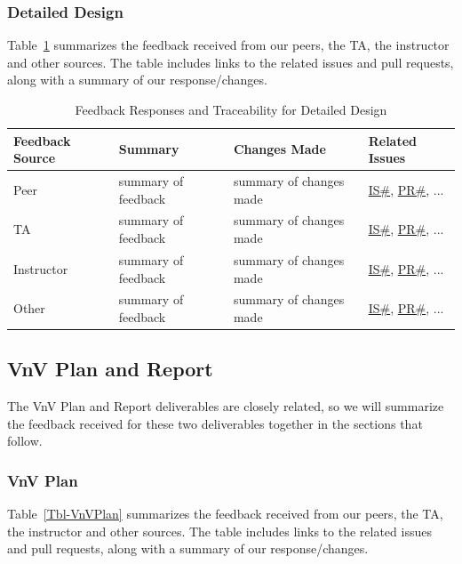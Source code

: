 \documentclass{article}
\begin{document}
\subsubsection{Detailed Design}

Table~\ref{Tbl-DetailedDesign} summarizes the feedback received from our peers,
the TA, the instructor and other sources.  The table includes links to the
related issues and pull requests, along with a summary of our response/changes.

\begin{longtable}{|p{2cm}|p{4cm}|p{5cm}|p{4cm}|}
\caption{Feedback Responses and Traceability for Detailed Design}
\label{Tbl-DetailedDesign}\\

\hline
\textbf{Feedback Source} & \textbf{Summary} & \textbf{Changes Made} & \textbf{Related Issues} \\ 
\hline
\endhead

Peer & summary of feedback & summary of changes made & \href{link}{IS\#}, \href{link}{PR\#}, ... \\
\hline
TA & summary of feedback & summary of changes made & \href{link}{IS\#}, \href{link}{PR\#}, ... \\
\hline
Instructor & summary of feedback & summary of changes made & \href{link}{IS\#}, \href{link}{PR\#}, ... \\
\hline
Other & summary of feedback & summary of changes made & \href{link}{IS\#}, \href{link}{PR\#}, ... \\
\hline
\end{longtable}

\subsection{VnV Plan and Report}

The VnV Plan and Report deliverables are closely related, so we will summarize
the feedback received for these two deliverables together in the sections that
follow.

\subsubsection{VnV Plan}
Table~\ref{Tbl-VnVPlan} summarizes the feedback received from our peers, the TA, the instructor and other sources.  The table includes links to the related issues and pull requests, along with a summary of our response/changes.
\end{document}
